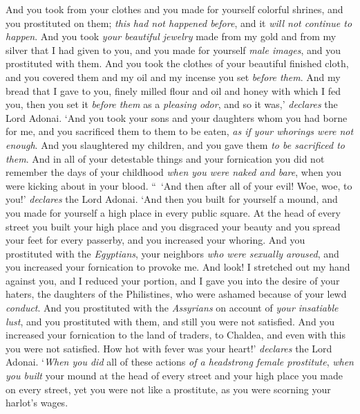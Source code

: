 \begin{biblechapter}
\verse And you took from your clothes and you made for yourself colorful shrines, and you prostituted on them; \textit{this had not happened before}, and it \textit{will not continue to happen}.
\verse And you took \textit{your beautiful jewelry} made from my gold and from my silver that I had given to you, and you made for yourself \textit{male images}, and you prostituted with them.
\verse And you took the clothes of your beautiful finished cloth, and you covered them and my oil and my incense you set \textit{before them}.
\verse And my bread that I gave to you, finely milled flour and oil and honey with which I fed you, then you set it \textit{before them} as a \textit{pleasing odor}, and so it was,’ \textit{declares} the Lord Adonai.
\verse ‘And you took your sons and your daughters whom you had borne for me, and you sacrificed them to them to be eaten, \textit{as if your whorings were not enough}.
\verse And you slaughtered my children, and you gave them \textit{to be sacrificed to them}.
\verse And in all of your detestable things and your fornication you did not remember the days of your childhood \textit{when you were naked and bare}, when you were kicking about in your blood.
\verse “ ‘And then after all of your evil! Woe, woe, to you!’ \textit{declares} the Lord Adonai.
\verse ‘And then you built for yourself a mound, and you made for yourself a high place in every public square.
\verse At the head of every street you built your high place and you disgraced your beauty and you spread your feet for every passerby, and you increased your whoring.
\verse And you prostituted with the \textit{Egyptians}, your neighbors \textit{who were sexually aroused}, and you increased your fornication to provoke me.
\verse And look! I stretched out my hand against you, and I reduced your portion, and I gave you into the desire of your haters, the daughters of the Philistines, who were ashamed because of your lewd \textit{conduct}.
\verse And you prostituted with the \textit{Assyrians} on account of \textit{your insatiable lust}, and you prostituted with them, and still you were not satisfied.
\verse And you increased your fornication to the land of traders, to Chaldea, and even with this you were not satisfied.
\verse How hot with fever was your heart!’ \textit{declares} the Lord Adonai. ‘\textit{When you did} all of these actions \textit{of a headstrong female prostitute},
\verse \textit{when you built} your mound at the head of every street and your high place you made on every street, yet you were not like a prostitute, as you were scorning your harlot’s wages.

\end{biblechapter}
